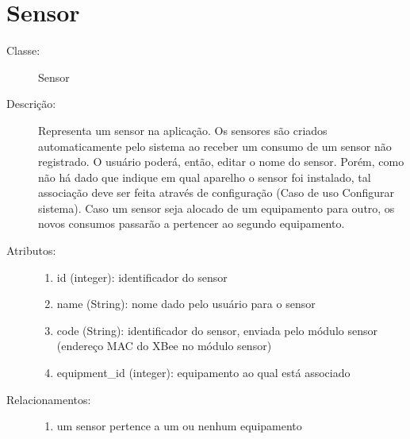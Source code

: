 \section{Sensor}
\begin{description}
  \item[Classe:] Sensor
  \item[Descrição:] Representa um sensor na aplicação. Os sensores são criados automaticamente pelo sistema ao receber um consumo de um sensor não registrado. O usuário poderá, então, editar o nome do sensor. Porém, como não há dado que indique em qual aparelho o sensor foi instalado, tal associação deve ser feita através de configuração (Caso de uso Configurar sistema). Caso um sensor seja alocado de um equipamento para outro, os novos consumos passarão a pertencer ao segundo equipamento.
  \item[Atributos:] \hfill
    \begin{enumerate}
      \item id (integer): identificador do sensor
      \item name (String): nome dado pelo usuário para o sensor
      \item code (String): identificador do sensor, enviada pelo módulo sensor (endereço MAC do XBee no módulo sensor)
      \item equipment\_id (integer): equipamento ao qual está associado
    \end{enumerate}
  \item[Relacionamentos:] \hfill
    \begin{enumerate}
      \item um sensor pertence a um ou nenhum equipamento
    \end{enumerate}
\end{description} 
%
